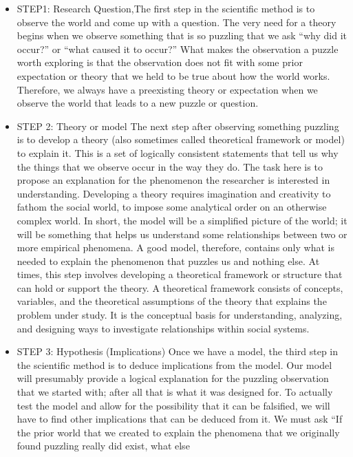 \documentclass{book}
\begin{document}
\begin{itemize}
\item
  STEP1: Research Question,The first step in the scientific method is to
  observe the world and come up with a question. The very need for a theory
  begins when we observe something that is so puzzling that we ask ``why did
  it occur?'' or ``what caused it to occur?'' What makes the observation a
  puzzle worth exploring is that the observation does not fit with some prior
  expectation or theory that we held to be true about how the world works.
  Therefore, we always have a preexisting theory or expectation when we
  observe the world that leads to a new puzzle or question.
\item
  STEP 2: Theory or model The next step after observing something puzzling is
  to develop a theory (also sometimes called theoretical framework or model)
  to explain it. This is a set of logically consistent statements that tell us
  why the things that we observe occur in the way they do. The task here is to
  propose an explanation for the phenomenon the researcher is interested in
  understanding. Developing a theory requires imagination and creativity to
  fathom the social world, to impose some analytical order on an otherwise
  complex world. In short, the model will be a simplified picture of the
  world; it will be something that helps us understand some relationships
  between two or more empirical phenomena. A good model, therefore, contains
  only what is needed to explain the phenomenon that puzzles us and nothing
  else. At times, this step involves developing a theoretical framework or
  structure that can hold or support the theory. A theoretical framework
  consists of concepts, variables, and the theoretical assumptions of the
  theory that explains the problem under study. It is the conceptual basis for
  understanding, analyzing, and designing ways to investigate relationships
  within social systems.\\
\item
  STEP 3: Hypothesis (Implications) Once we have a model, the third step in
  the scientific method is to deduce implications from the model. Our model
  will presumably provide a logical explanation for the puzzling observation
  that we started with; after all that is what it was designed for. To
  actually test the model and allow for the possibility that it can be
  falsified, we will have to find other implications that can be deduced from
  it. We must ask ``If the prior world that we created to explain the
  phenomena that we originally found puzzling really did exist, what else

\end{itemize}
\end{document}
